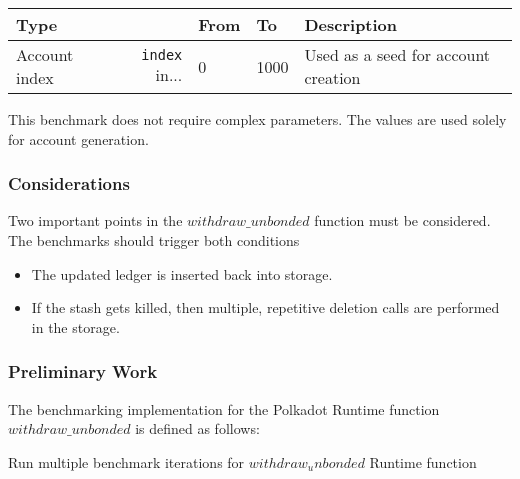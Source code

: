 \documentclass[11pt,a4paper]{article}
\begin{document}
\begin{center}
  \begin{tabular}{ l|r l l l }
    \textbf{Type} && \textbf{From} & \textbf{To} & \textbf{Description}\\
    \hline
    Account index & \verb|index| in... & 0 & 1000 & Used as a seed for account
    creation \\
  \end{tabular}
\end{center}

This benchmark does not require complex parameters. The values are used solely
for account generation.

\subsubsection{Considerations}

Two important points in the $withdraw\_unbonded$ function must be considered.
The benchmarks should trigger both conditions

\begin{itemize}
  \item The updated ledger is inserted back into storage.
  \item If the stash gets killed, then multiple, repetitive deletion calls are
  performed in the storage.
\end{itemize}

\subsubsection{Preliminary Work}
The benchmarking implementation for the Polkadot Runtime function
$withdraw\_unbonded$ is defined as follows:
\newline

\begin{algorithm}[H]\label{sec:algo-benchmark-transfer}
  \caption{Run multiple benchmark iterations for $withdraw_unbonded$ Runtime function}
  \SetAlgoLined
  \BlankLine
  \BlankLine
\end{algorithm}
\end{document}
